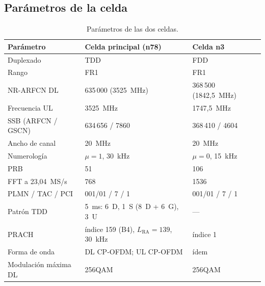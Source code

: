 \subsection{Parámetros de la celda}
\begin{table}[htbp]
\centering
\caption{Parámetros de las dos celdas.}
\label{tab:celda}
\begin{tabular}{lll}
\toprule
Parámetro & Celda principal (n78) & Celda n3 \\
\midrule
Duplexado & TDD & FDD \\
Rango & FR1 & FR1 \\
NR-ARFCN DL & 635\,000 (3525~MHz) & 368\,500 (1842,5~MHz) \\
Frecuencia UL & 3525~MHz & 1747,5~MHz \\
SSB (ARFCN / GSCN) & 634\,656 / 7860 & 368\,410 / 4604 \\
Ancho de canal & 20~MHz & 20~MHz \\
Numerología & $\mu=1$, 30~kHz & $\mu=0$, 15~kHz \\
PRB & 51 & 106 \\
FFT a 23,04~MS/s & 768 & 1536 \\
PLMN / TAC / PCI & 001/01 / 7 / 1 & 001/01 / 7 / 1 \\
Patrón TDD & 5~ms: 6~D, 1~S (8~D + 6~G), 3~U & --- \\
PRACH & índice 159 (B4), $L_\text{RA}=139$, 30~kHz & índice 1 \\
Forma de onda & DL CP-OFDM; UL CP-OFDM & ídem \\
Modulación máxima DL & 256QAM & 256QAM \\
\bottomrule
\end{tabular}
\end{table}

